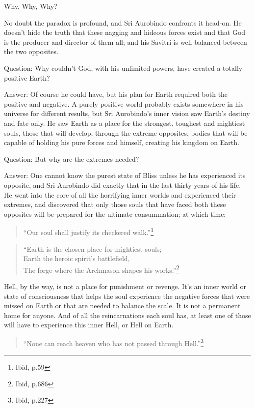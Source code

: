 \documentclass[12pt,a4paper]{book}
\begin{document}
\noindent Why, Why, Why?

No doubt the paradox is profound, and Sri Aurobindo confronts it
head-on. He doesn't hide the truth that these nagging and hideous
forces exist and that God is the producer and director of them all;
and his Savitri is well balanced between the two opposites.

Question: Why couldn't God, with his unlimited powers, have created a
totally positive Earth?

Answer: Of course he could have, but his plan for Earth required both
the positive and negative. A purely positive world probably exists
somewhere in his universe for different results, but Sri Aurobindo's
inner vision saw Earth's destiny and fate only. He saw Earth as a
place for the strongest, toughest and mightiest souls, those that will
develop, through the extreme opposites, bodies that will be capable of
holding his pure forces and himself, creating his kingdom on Earth.

Question: But why are the extremes needed?

Answer: One cannot know the purest state of Bliss unless he has
experienced its opposite, and Sri Aurobindo did exactly that in the
last thirty years of his life. He went into the core of all the
horrifying inner worlds and experienced their extremes, and discovered
that only those souls that have faced both these opposites will be
prepared for the ultimate consummation; at which time:

\begin{verse}
``Our soul shall justify its checkered walk.''\footnote{Ibid, p.59}
\end{verse}

\begin{verse}
``Earth is the chosen place for mightiest souls;\\ Earth the heroic
  spirit's battlefield,\\ The forge where the Archmason shapes his
  works.''\footnote{Ibid, p.686}
\end{verse}

Hell, by the way, is not a place for punishment or revenge. It's an
inner world or state of consciousness that helps the soul experience
the negative forces that were missed on Earth or that are needed to
balance the scale. It is not a permanent home for anyone. And of all
the reincarnations each soul has, at least one of those will have to
experience this inner Hell, or Hell on Earth.

\begin{verse}
``None can reach heaven who has not passed through
  Hell.''\footnote{Ibid, p.227}
\end{verse}
\end{document}
